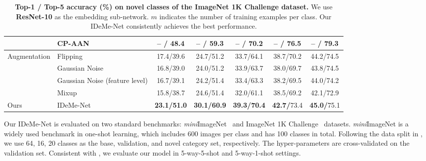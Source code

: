 \documentclass[10pt,letterpaper,twocolumn]{article}
\providecommand{\tabularnewline}{\\}
\begin{document}
\begin{table*}
\begin{centering}
\begin{tabular}{llccccc}
 & {\small{}{}CP-AAN~\cite{cogan} } & {\small{}{}-- / {}48.4 } & {\small{}{}-- / {}59.3 } & {\small{}{}-- / {}70.2 } & {\small{}{}-- / {}\textbf{\small{}{}{}{}76.5} } &  {\small{}{}{}-- / }\textbf{\small{}{}{}{}79.3}\tabularnewline
\hline 
\multirow{4}{*}{{\small{}Augmentation }} & {\small{}{}{}{}{}{}Flipping  } & {\small{}{}{}{}{}{}17.4/39.6  } & {\small{}{}{}{}{}{}24.7/51.2  } & {\small{}{}{}{}{}{}33.7/64.1  } & {\small{}{}{}{}{}{}38.7/70.2  } & {\small{}{}{}{}{}{}44.2/74.5 }\tabularnewline
 & {\small{}{}{}{}{}{}Gaussian Noise  } & {\small{}{}{}{}{}{}16.8/39.0  } & {\small{}{}{}{}{}{}24.0/51.2  } & {\small{}{}{}{}{}{}33.9/63.7  } & {\small{}{}{}{}{}{}38.0/69.7  } & {\small{}{}{}{}{}{}43.8/74.5 }\tabularnewline
 & {\small{}{}{}Gaussian Noise (feature level)  } & {\small{}{}{}{}{}{}16.7/39.1  } & {\small{}{}{}{}{}{}24.2/51.4  } & {\small{}{}{}{}{}{}33.4/63.3  } & {\small{}{}{}{}{}{}38.2/69.5  } & {\small{}{}{}{}{}{}44.0/74.2 }\tabularnewline
 & {\small{}{}{}{}{}{}Mixup~\cite{mixup}} & {\small{}{}{}{}{}{}15.8/38.7  } & {\small{}{}{}{}{}{}24.6/51.4  } & {\small{}{}{}{}{}{}32.0/61.1  } & {\small{}{}{}{}{}{}38.5/69.2  } & {\small{}{}{}{}{}{}42.1/72.9 }\tabularnewline
\hline 
\hline 
{\small{}Ours  } & {\small{}{}{}{}{}{}IDeMe-Net  } & \textbf{\small{}{}{}{}{}{}{}23.1/51.0}{\small{}{}{}{}  } & \textbf{\small{}{}30.1/60.9}{\small{}{}  } & \textbf{\small{}{}{}{}{}{}39.3/70.4}{\small{}{}  } & \textbf{\small{}{}42.7{}/}{\small{}{}73.4  } & \textbf{\small{}{}{}{}{}{}45.0{}/}{\small{}{}{}75.1}\tabularnewline
\hline 
\end{tabular}
\vspace{0.1in}
\caption{\label{tab:Imagenet1k-resnet10}\textbf{Top-1 / Top-5 accuracy (\%)
on novel classes of the ImageNet 1K Challenge dataset.} We use \textbf{ResNet-10}
as the embedding sub-network. $m$ indicates the number of training
examples per class.  Our IDeMe-Net consistently achieves the best performance.}\par\end{centering}


\end{table*}

Our IDeMe-Net is evaluated on two standard benchmarks: \emph{mini}ImageNet~\cite{matchingnet_1shot}
and ImageNet 1K Challenge~\cite{2017ICCVaug} datasets. \emph{mini}ImageNet
is a widely used benchmark in one-shot learning, which includes 600
images per class and has 100 classes in total. Following the data
split in \cite{Sachin2017}, we use 64, 16, 20 classes as the base,
validation, and novel category set, respectively. The hyper-parameters
are cross-validated on the validation set. Consistent with \cite{matchingnet_1shot,Sachin2017}, we evaluate our model in 5-way-5-shot and
5-way-1-shot settings.
\end{document}
